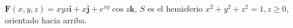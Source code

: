 \item $\mathbf{F}(x, y, z) = xyz \mathbf{i} + x \mathbf{j} + e^{xy} \cos z \mathbf{k}$, $S$ es el hemisferio $x^2 + y^2 + z^2 = 1, z \ge 0$, orientado hacia arriba.
